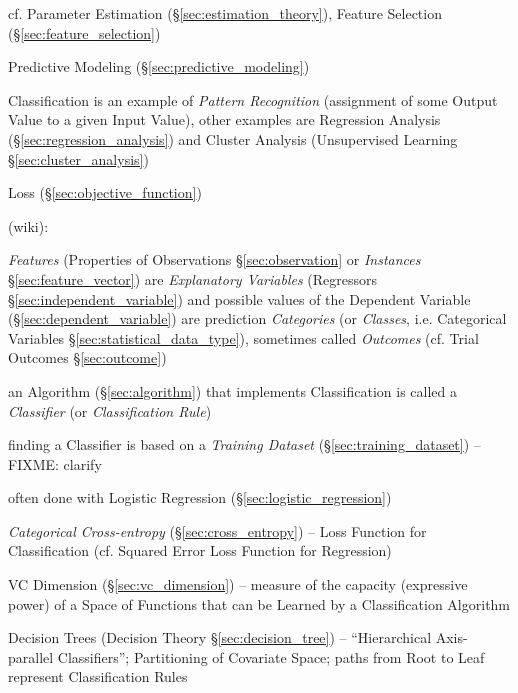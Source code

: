 cf. Parameter Estimation (\S\ref{sec:estimation_theory}), Feature Selection
(\S\ref{sec:feature_selection})

\fist Predictive Modeling (\S\ref{sec:predictive_modeling})

Classification is an example of \emph{Pattern Recognition} (assignment of some
Output Value to a given Input Value), other examples are Regression Analysis
(\S\ref{sec:regression_analysis}) and Cluster Analysis (Unsupervised Learning
\S\ref{sec:cluster_analysis})

Loss (\S\ref{sec:objective_function})

(wiki):

\emph{Features} (Properties of Observations \S\ref{sec:observation} or
\emph{Instances} \S\ref{sec:feature_vector}) are \emph{Explanatory Variables}
(Regressors \S\ref{sec:independent_variable}) and possible values of the
Dependent Variable (\S\ref{sec:dependent_variable}) are prediction
\emph{Categories} (or \emph{Classes}, i.e. Categorical Variables
\S\ref{sec:statistical_data_type}), sometimes called \emph{Outcomes} (cf. Trial
Outcomes \S\ref{sec:outcome})

an Algorithm (\S\ref{sec:algorithm}) that implements Classification is called a
\emph{Classifier} (or \emph{Classification Rule})

finding a Classifier is based on a \emph{Training Dataset}
(\S\ref{sec:training_dataset}) --FIXME: clarify

often done with Logistic Regression (\S\ref{sec:logistic_regression})

\emph{Categorical Cross-entropy} (\S\ref{sec:cross_entropy}) -- Loss Function
for Classification (cf. Squared Error Loss Function for Regression)

\fist VC Dimension (\S\ref{sec:vc_dimension}) -- measure of the capacity
(expressive power) of a Space of Functions that can be Learned by a
Classification Algorithm

\fist Decision Trees (Decision Theory \S\ref{sec:decision_tree}) --
``Hierarchical Axis-parallel Classifiers''; Partitioning of Covariate Space;
paths from Root to Leaf represent Classification Rules

